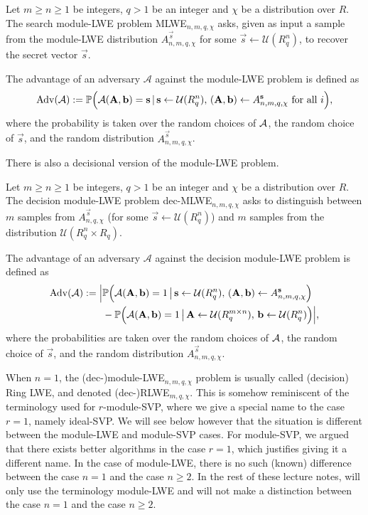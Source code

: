 \begin{definition}
Let $m \geq n \geq 1$ be integers, $q >1$ be an integer and $\chi$ be a distribution over $R$. The search module-LWE problem MLWE$_{n,m,q,\chi}$ asks, given as input a sample from the module-LWE distribution $A^{\vec s}_{n,m,q,\chi}$ for some $\vec s \leftarrow \mathcal{U}(R_q^n)$, to recover the secret vector $\vec s$.

The advantage of an adversary $\mathcal{A}$ against the module-LWE problem is defined as
\[ \operatorname{Adv}(\mathcal{A}) := \mathbb{P}\Big(\mathcal{A}(\mathbf A, \mathbf b) = \mathbf s\,|\, \mathbf s \leftarrow \mathcal{U}(R_q^n),\, (\mathbf A, \mathbf b) \leftarrow A^{\mathbf s}_{n,m,q,\chi} \text{ for all }i\Big), \]
where the probability is taken over the random choices of $\mathcal{A}$, the random choice of $\vec s$, and the random distribution $A^{\vec s}_{n,m,q,\chi}$.
\end{definition}

There is also a decisional version of the module-LWE problem.

\begin{definition}
Let $m \geq n \geq 1$ be integers, $q >1$ be an integer and $\chi$ be a distribution over $R$. The decision module-LWE problem dec-MLWE$_{n,m,q,\chi}$ asks to distinguish between $m$ samples from $A^{\vec s}_{n,q,\chi}$ (for some $\vec s \leftarrow \mathcal{U}(R_q^n)$) and $m$ samples from the distribution $\mathcal{U}(R_q^n \times R_q)$.

The advantage of an adversary $\mathcal{A}$ against the decision module-LWE problem is defined as
\begin{align*} \operatorname{Adv}(\mathcal{A}) := \Big| &\mathbb{P}\Big(\mathcal{A}(\mathbf A, \mathbf b) = 1\,\big|\, \mathbf s \leftarrow \mathcal{U}(R_q^n),\, (\mathbf A, \mathbf b) \leftarrow A^{\mathbf s}_{n,m,q,\chi}\Big) \\
&- \mathbb{P}\Big(\mathcal{A}(\mathbf A, \mathbf b) = 1\,\big|\, \mathbf A \leftarrow \mathcal{U}(R_q^{m \times n}), \, \mathbf b \leftarrow \mathcal{U}(R_q^n)\Big) \Big|,
\end{align*}
where the probabilities are taken over the random choices of $\mathcal{A}$, the random choice of $\vec s$, and the random distribution $A^{\vec s}_{n,m,q,\chi}$.
\end{definition}

When $n = 1$, the (dec-)module-LWE$_{n,m,q,\chi}$ problem is usually called (decision) Ring LWE, and denoted (dec-)RLWE$_{m,q,\chi}$.
This is somehow reminiscent of the terminology used for $r$-module-SVP, where we give a special name to the case $r = 1$, namely ideal-SVP.
We will see below however that the situation is different between the module-LWE and module-SVP cases. For module-SVP, we argued that there exists better algorithms in the case $r = 1$, which justifies giving it a different name. In the case of module-LWE, there is no such (known) difference between the case $n = 1$ and the case $n \geq 2$. In the rest of these lecture notes, will only use the terminology module-LWE and will not make a distinction between the case $n = 1$ and the case $n \geq 2$.

